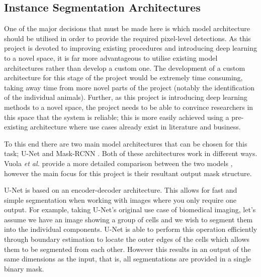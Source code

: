 \subsection{Instance Segmentation Architectures}\label{ch:cetDet,sec:deciding,sub:instanceSegArchitectures}

One of the major decisions that must be made here is which model architecture should be utilised in order to provide the required pixel-level detections. As this project is devoted to improving existing procedures and introducing deep learning to a novel space, it is far more advantageous to utilise existing model architectures rather than develop a custom one. The development of a custom architecture for this stage of the project would be extremely time consuming, taking away time from more novel parts of the project (notably the identification of the individual animals). Further, as this project is introducing deep learning methods to a novel space, the project needs to be able to convince researchers in this space that the system is reliable; this is more easily achieved using a pre-existing architecture where use cases already exist in literature and business. 

To this end there are two main model architectures that can be chosen for this task; U-Net \cite{ronneberger_u-net_2015} and Mask-RCNN \cite{he_mask_2017}. Both of these architectures work in different ways. Vuola \textit{et al.} provide a more detailed comparison between the two models \cite{vuola_mask-rcnn_2019}, however the main focus for this project is their resultant output mask structure. 

U-Net is based on an encoder-decoder architecture. This allows for fast and simple segmentation when working with images where you only require one output. For example, taking U-Net's original use case of biomedical imaging, let's assume we have an image showing a group of cells and we wish to segment them into the individual components. U-Net is able to perform this operation efficiently through boundary estimation to locate the outer edges of the cells which allows them to be segmented from each other. However this results in an output of the same dimensions as the input, that is, all segmentations are provided in a single binary mask. 

